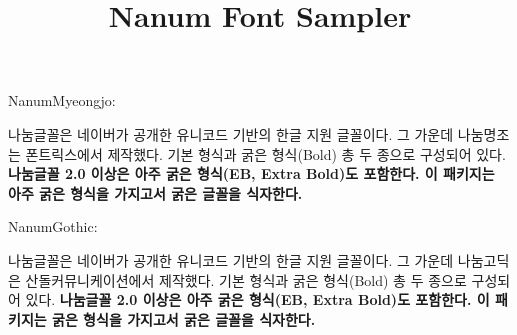 \documentclass[a4paper,12pt]{article}
\title{Nanum Font Sampler}\author{}\date{}
\begin{document}
\maketitle

NanumMyeongjo:

나눔글꼴은 네이버가 공개한 유니코드 기반의 한글 지원 글꼴이다.
그 가운데 나눔명조는 폰트릭스에서 제작했다.
기본 형식과 굵은 형식(Bold) 총 두 종으로 구성되어 있다.
\textbf{나눔글꼴 2.0 이상은 아주 굵은 형식(EB, Extra Bold)도 포함한다.
이 패키지는 아주 굵은 형식을 가지고서 굵은 글꼴을 식자한다.}

\bigskip
\sffamily

NanumGothic:

나눔글꼴은 네이버가 공개한 유니코드 기반의 한글 지원 글꼴이다.
그 가운데 나눔고딕은 산돌커뮤니케이션에서 제작했다.
기본 형식과 굵은 형식(Bold) 총 두 종으로 구성되어 있다.
\textbf{나눔글꼴 2.0 이상은 아주 굵은 형식(EB, Extra Bold)도 포함한다.
이 패키지는 굵은 형식을 가지고서 굵은 글꼴을 식자한다.}
\end{document}
